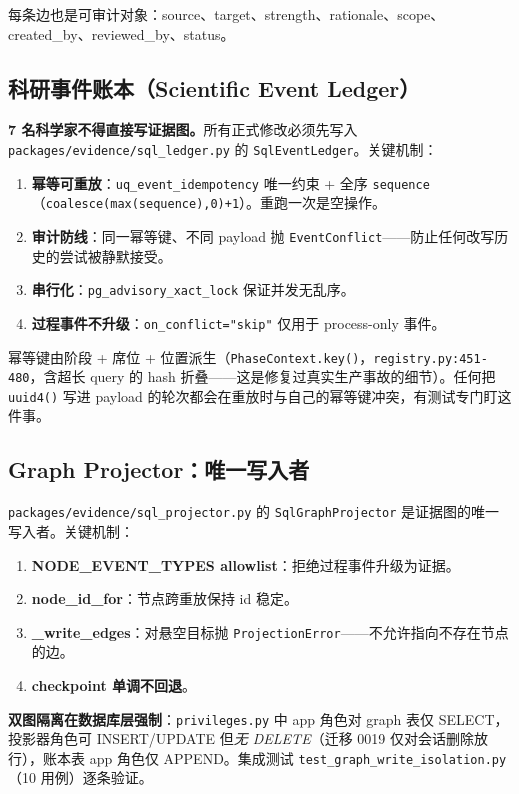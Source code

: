 每条边也是可审计对象：source、target、strength、rationale、scope、created\_by、reviewed\_by、status。

\subsection{科研事件账本（Scientific Event Ledger）}

\textbf{7 名科学家不得直接写证据图。}所有正式修改必须先写入 \texttt{packages/evidence/sql\_ledger.py} 的 \texttt{SqlEventLedger}。关键机制：

\begin{enumerate}
\item \textbf{幂等可重放}：\texttt{uq\_event\_idempotency} 唯一约束 + 全序 \texttt{sequence}（\texttt{coalesce(max(sequence),0)+1}）。重跑一次是空操作。
\item \textbf{审计防线}：同一幂等键、不同 payload 抛 \texttt{EventConflict}——防止任何改写历史的尝试被静默接受。
\item \textbf{串行化}：\texttt{pg\_advisory\_xact\_lock} 保证并发无乱序。
\item \textbf{过程事件不升级}：\texttt{on\_conflict="skip"} 仅用于 process-only 事件。
\end{enumerate}

幂等键由阶段 + 席位 + 位置派生（\texttt{PhaseContext.key()}，\texttt{registry.py:451-480}，含超长 query 的 hash 折叠——这是修复过真实生产事故的细节）。任何把 \texttt{uuid4()} 写进 payload 的轮次都会在重放时与自己的幂等键冲突，有测试专门盯这件事。

\subsection{Graph Projector：唯一写入者}

\texttt{packages/evidence/sql\_projector.py} 的 \texttt{SqlGraphProjector} 是证据图的唯一写入者。关键机制：

\begin{enumerate}
\item \textbf{NODE\_EVENT\_TYPES allowlist}：拒绝过程事件升级为证据。
\item \textbf{node\_id\_for}：节点跨重放保持 id 稳定。
\item \textbf{\_write\_edges}：对悬空目标抛 \texttt{ProjectionError}——不允许指向不存在节点的边。
\item \textbf{checkpoint 单调不回退}。
\end{enumerate}

\textbf{双图隔离在数据库层强制}：\texttt{privileges.py} 中 app 角色对 graph 表仅 SELECT，投影器角色可 INSERT/UPDATE 但\emph{无 DELETE}（迁移 0019 仅对会话删除放行），账本表 app 角色仅 APPEND。集成测试 \texttt{test\_graph\_write\_isolation.py}（10 用例）逐条验证。

